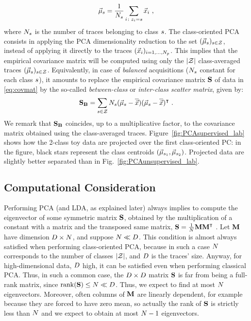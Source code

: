 \begin{equation*}
\mmmXclass = \frac{1}{\nbTracesPerClass}\sum_{i\colon \sensVar_i=\sensVarGenValue} \vLeakVec_i \mbox{ ,}
\end{equation*}
where  $\nbTracesPerClass$ is the number of traces belonging to class $\sensVarGenValue$. The class-oriented PCA  consists in applying the PCA dimensionality reduction to the set $(\mmmXclass)_{\sensVarGenValue \in \sensVarSet}$, instead of applying it directly to the traces $(\vLeakVec_i)_{i=1,\dots,\nbProfilingTraces}$. This implies that the empirical covariance matrix will be computed using only the $\nbClasses$ class-averaged traces $(\mmmXclass)_{\sensVarGenValue \in \sensVarSet}$. Equivalently, in case of \textit{balanced} acquisitions ($\nbTracesPerClass$ constant for each class $\sensVarGenValue$), it amounts to replace the empirical covariance matrix $\covmat$ of data in \eqref{eq:covmat}  by the so-called {\em between-class} or  {\em inter-class scatter matrix}, given by:
\begin{equation}\label{eq:SB}
\SB = \sum_{\sensVarGenValue\in\sensVarSet}\nbTracesPerClass(\mmmXclass-\mmmX)(\mmmXclass-\mmmX)^\intercal \mbox{ .}
\end{equation}
We remark that $\SB$ coincides, up to a multiplicative factor, to the covariance matrix obtained using the class-averaged traces. Figure~\ref{fig:PCAsupervised_lab} shows how the 2-class toy data are projected over the first class-oriented PC: in the figure, black stars represent the class centroids $(\mmmXclass[\sensVarValue{1}],\mmmXclass[\sensVarValue{2}])$. Projected data are slightly better separated than in Fig.~\ref{fig:PCAunsupervised_lab}.



\subsection{Computational Consideration}\label{sec:trick}
Performing PCA (and LDA, as explained later) always implies to compute the eigenvector of some symmetric matrix $\covmat$, obtained by the multiplication of a constant with a matrix and the transposed same matrix, \eg $\covmat = \frac{1}{\nbTraces}\measuresMatrix\measuresMatrix^\intercal$ . Let $\measuresMatrix$ have dimension $\traceLength\times\nbTraces$, and suppose $\nbTraces\ll \traceLength$. This condition is almost always satisfied when performing class-oriented PCA, because in such a case $\nbTraces$ corresponds to the number of classes $\nbClasses$, and $\traceLength$ is the traces' size. Anyway, for high-dimensional data, \ie $\traceLength$ high, it can be satisfied even when performing classical PCA. Thus, in such a common case, the $\traceLength\times\traceLength$ matrix $\covmat$ is far from being a full-rank matrix, since $\mathrm{rank}(\covmat)\leq \nbTraces\ll \traceLength$. Thus, we expect to find at most $\nbTraces$ eigenvectors. Moreover, often columns of $\measuresMatrix$ are linearly dependent, for example because they are forced to have zero mean, so actually the rank of $\covmat$ is strictly less than $\nbTraces$ and we expect to obtain at most $\nbTraces-1$ eigenvectors.\\

